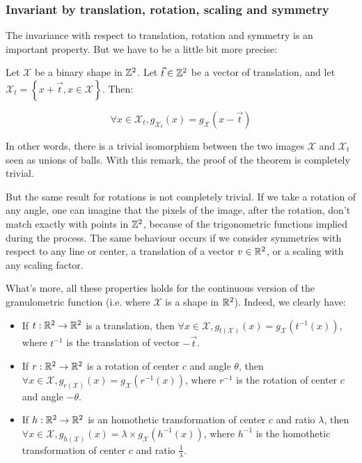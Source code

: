 \subsubsection{Invariant by translation, rotation, scaling and symmetry}

The invariance with respect to translation, rotation and symmetry is an important property. But we have to be a little bit more precise:

\begin{theoreme}
	Let $\mathcal{X}$ be a binary shape in $\mathbb{Z}^{2}$. Let $\vec{t} \in \mathbb{Z}^{2}$ be a vector of translation, and let $\mathcal{X}_{t} = \left\{ x + \vec{t}, x \in \mathcal{X} \right\}$. Then:
	
	$$ \forall x \in \mathcal{X}_{t}, g_{\mathcal{X}_{t}}(x) = g_{\mathcal{X}}(x-\vec{t}) $$
\end{theoreme}

In other words, there is a trivial isomorphism between the two images $\mathcal{X}$ and  $\mathcal{X}_t$ seen as unions of balls. With this remark, the proof of the theorem is completely trivial.

But the same result for rotations is not completely trivial. If we take a rotation of any angle, one can imagine that the pixels of the image, after the rotation, don't match exactly with points in $\mathbb{Z}^{2}$, because of the trigonometric functions implied during the process. The same behaviour occurs if we consider symmetries with respect to any line or center, a translation of a vector $v \in \mathbb{R}^2$, or a scaling with any scaling factor.


What's more, all these properties holds for the continuous version of the granulometric function (i.e. where $\mathcal{X}$ is a shape in $\mathbb{R}^2$). Indeed, we clearly have:

\begin{remarque}
	\begin{itemize}
		\item If $t : \mathbb{R}^2 \to \mathbb{R}^2$ is a translation, then $\forall x \in \mathcal{X}, g_{t(\mathcal{X})}(x) = g_{\mathcal{X}}(t^{-1}(x))$, where $t^{-1}$ is the translation of vector $-\vec{t}$.
		\item If $r : \mathbb{R}^2 \to \mathbb{R}^2$ is a rotation of center $c$ and angle $\theta$, then $\forall x \in \mathcal{X}, g_{r(\mathcal{X})}(x) = g_{\mathcal{X}}(r^{-1}(x))$, where $r^{-1}$ is the rotation of center $c$ and angle $-\theta$. 
		\item If $h : \mathbb{R}^2 \to \mathbb{R}^2$ is an homothetic transformation of center $c$ and ratio $\lambda$, then $\forall x \in \mathcal{X}, g_{h(\mathcal{X})}(x) = \lambda \times g_{\mathcal{X}}(h^{-1}(x))$, where $h^{-1}$ is the homothetic transformation of center $c$ and ratio $\frac{1}{\lambda}$.
	\end{itemize}
\end{remarque}

